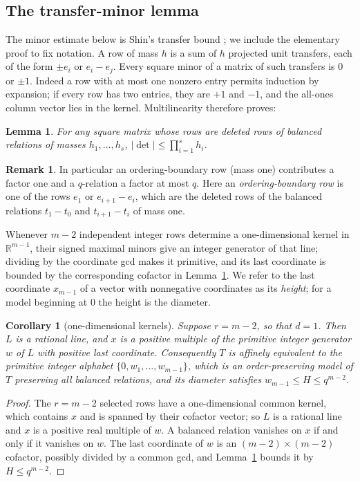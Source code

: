 \documentclass[11pt,reqno]{amsart}
\theoremstyle{plain}
\newtheorem{lemma}[theorem]{Lemma}
\newtheorem{corollary}[theorem]{Corollary}
\theoremstyle{definition}
\newtheorem{remark}[theorem]{Remark}
\theoremstyle{plain}
\newcommand{\R}{\mathbb{R}}
\theoremstyle{plain}
\theoremstyle{plain}
\theoremstyle{plain}
\theoremstyle{plain}
\theoremstyle{plain}
\theoremstyle{definition}
\theoremstyle{definition}
\theoremstyle{definition}
\theoremstyle{plain}
\begin{document}
\subsection{The transfer-minor lemma}
The minor estimate below is Shin's transfer bound
\cite[Lemma~7.1]{M-Shin26}; we include the elementary proof to fix notation.
A row of mass $h$ is a sum of $h$ projected unit transfers, each of the form
$\pm e_i$ or $e_i-e_j$. Every square minor of a matrix of such transfers is
$0$ or $\pm1$. Indeed a row with at most one nonzero entry permits induction
by expansion; if every row has two entries, they are $+1$ and $-1$, and the
all-ones column vector lies in the kernel. Multilinearity therefore proves:
\begin{lemma}\label{M-lem:mass-minor}
For any square matrix whose rows are deleted rows of balanced relations of
masses $h_1,\ldots,h_s$, $|\det|\le\prod_{i=1}^sh_i$.
\end{lemma}
\begin{remark}\label{M-rem:mass-minor-rows}
In particular an ordering-boundary row (mass one) contributes a factor one
and a $q$-relation a factor at most $q$. Here an \emph{ordering-boundary
row} is one of the rows $e_1$ or $e_{i+1}-e_i$, which are the deleted rows
of the balanced relations $t_1-t_0$ and $t_{i+1}-t_i$ of mass one.
\end{remark}
Whenever $m-2$ independent integer
rows determine a one-dimensional kernel in $\R^{m-1}$, their signed maximal
minors give an integer generator of that line; dividing by the coordinate gcd
makes it primitive, and its last coordinate is bounded by the corresponding
cofactor in Lemma~\ref{M-lem:mass-minor}. We refer to the last coordinate
$x_{m-1}$ of a vector with nonnegative coordinates as its \emph{height}; for
a model beginning at $0$ the height is the diameter.

\begin{corollary}[one-dimensional kernels]\label{M-cor:max-rank}
Suppose $r=m-2$, so that $d=1$. Then $L$ is a rational line, and $x$ is a
positive multiple of the primitive integer generator $w$ of $L$ with positive
last coordinate. Consequently $T$ is affinely equivalent to the primitive
integer alphabet $\{0,w_1,\ldots,w_{m-1}\}$, which is an order-preserving
model of $T$ preserving all balanced relations, and its diameter satisfies
$w_{m-1}\le H\le q^{m-2}$.
\end{corollary}
\begin{proof}
The $r=m-2$ selected rows have a one-dimensional common kernel, which
contains $x$ and is spanned by their cofactor vector; so $L$ is a rational
line and $x$ is a positive real multiple of $w$. A balanced relation vanishes
on $x$ if and only if it vanishes on $w$. The last coordinate of $w$ is an
$(m-2)\times(m-2)$ cofactor, possibly divided by a common gcd, and
Lemma~\ref{M-lem:mass-minor} bounds it by $H\le q^{m-2}$.
\end{proof}
\end{document}
